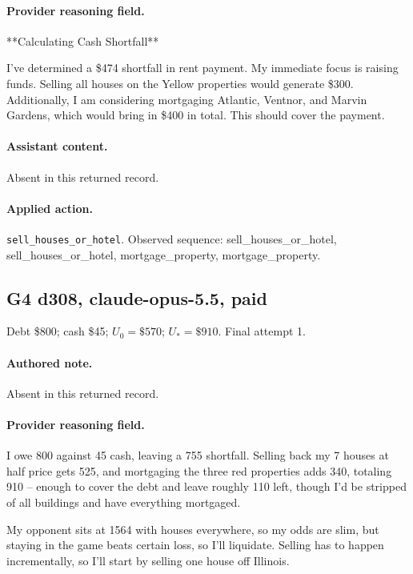 \paragraph{Provider reasoning field.} **Calculating Cash Shortfall**

I've determined a \$474 shortfall in rent payment. My immediate focus is raising funds. Selling all houses on the Yellow properties would generate \$300. Additionally, I am considering mortgaging Atlantic, Ventnor, and Marvin Gardens, which would bring in \$400 in total. This should cover the payment.




\paragraph{Assistant content.} Absent in this returned record.

\paragraph{Applied action.} \texttt{sell\_houses\_or\_hotel}. Observed sequence: sell\_houses\_or\_hotel, sell\_houses\_or\_hotel, mortgage\_property, mortgage\_property.

\subsection*{G4 d308, claude-opus-5.5, paid}

\noindent Debt \$800; cash \$45; $U_0=\$570$; $U_*=\$910$. Final attempt 1.\par

\paragraph{Authored note.} Absent in this returned record.

\paragraph{Provider reasoning field.} I owe 800 against 45 cash, leaving a 755 shortfall. Selling back my 7 houses at half price gets 525, and mortgaging the three red properties adds 340, totaling 910 -- enough to cover the debt and leave roughly 110 left, though I'd be stripped of all buildings and have everything mortgaged.

My opponent sits at 1564 with houses everywhere, so my odds are slim, but staying in the game beats certain loss, so I'll liquidate. Selling has to happen incrementally, so I'll start by selling one house off Illinois.



